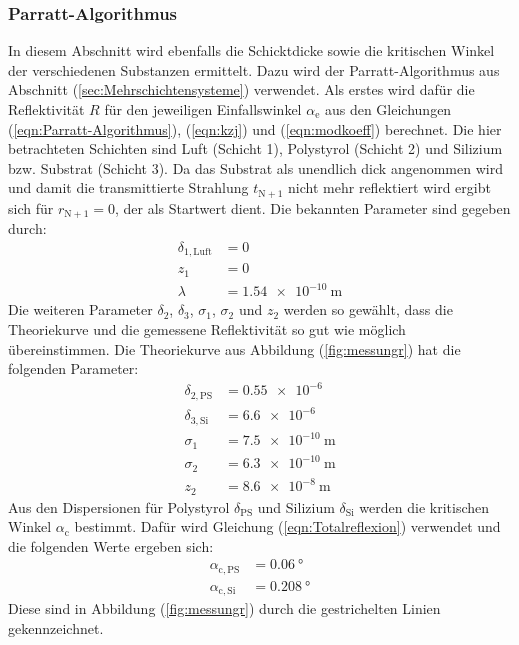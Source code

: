 \subsubsection{Parratt-Algorithmus}
In diesem Abschnitt wird ebenfalls die Schicktdicke sowie die kritischen Winkel der verschiedenen Substanzen ermittelt. Dazu wird der Parratt-Algorithmus aus Abschnitt (\ref{sec:Mehrschichtensysteme}) verwendet.
Als erstes wird dafür die Reflektivität $R$ für den jeweiligen Einfallswinkel $\alpha_\mathrm{e}$ aus den Gleichungen (\ref{eqn:Parratt-Algorithmus}), (\ref{eqn:kzj}) und (\ref{eqn:modkoeff}) berechnet.
Die hier betrachteten Schichten sind Luft (Schicht 1), Polystyrol (Schicht 2) und Silizium bzw. Substrat (Schicht 3). Da das Substrat als unendlich dick angenommen wird und damit die transmittierte Strahlung $t_\mathrm{N+1}$ nicht mehr reflektiert wird ergibt sich für $r_\mathrm{N+1}=0$, der als Startwert dient. Die bekannten Parameter sind gegeben durch:
\begin{align*}
  \delta_\mathrm{1,Luft}&=0 \\
  z_\mathrm{1}&=0 \\
  \lambda&=\SI{1.54 e-10}{\meter}
\end{align*}
Die weiteren Parameter $\delta_\mathrm{2}$, $\delta_\mathrm{3}$, $\sigma_\mathrm{1}$, $\sigma_\mathrm{2}$ und $z_\mathrm{2}$ werden so gewählt, dass die Theoriekurve und die gemessene Reflektivität so gut wie möglich übereinstimmen.
Die Theoriekurve aus Abbildung (\ref{fig:messungr}) hat die folgenden Parameter:
\begin{align*}
  \delta_\mathrm{2,PS} &=\SI{0.55 e-6}{} \\
  \delta_\mathrm{3,Si} &=\SI{6.6 e-6}{} \\
  \sigma_\mathrm{1} &=\SI{7.5 e-10}{\meter} \\
  \sigma_\mathrm{2} &=\SI{6.3 e-10}{\meter} \\
  z_\mathrm{2} &=\SI{8.6 e-8}{\meter}
\end{align*}
Aus den  Dispersionen für Polystyrol $\delta_\mathrm{PS}$ und Silizium $\delta_\mathrm{Si}$ werden die kritischen Winkel $\alpha_\mathrm{c}$ bestimmt. Dafür wird Gleichung (\ref{eqn:Totalreflexion}) verwendet und die folgenden Werte ergeben sich:
\begin{align*}
  \alpha_\mathrm{c,PS} &=\SI{0.06}{\degree} \\
  \alpha_\mathrm{c,Si} &=\SI{0.208}{\degree}
\end{align*}
Diese sind in Abbildung (\ref{fig:messungr}) durch die gestrichelten Linien gekennzeichnet.
